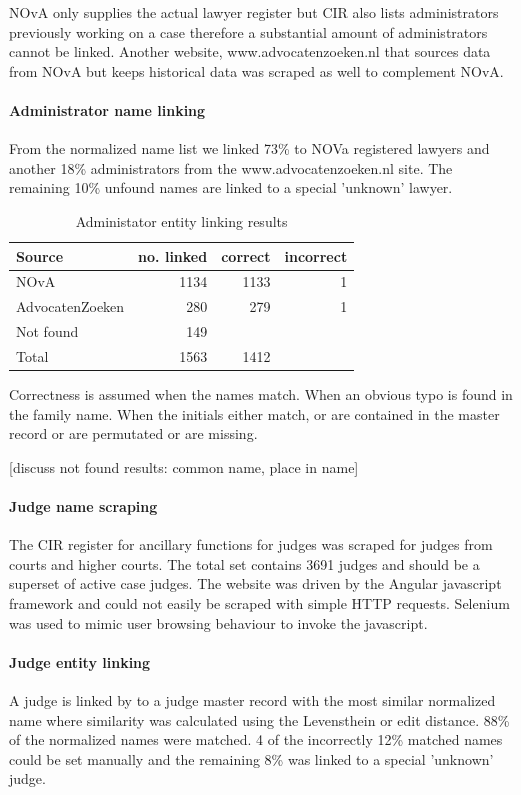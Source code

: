 NOvA only supplies the actual lawyer register but CIR also lists administrators previously working on a case therefore a substantial amount of administrators cannot be linked. Another website, www.advocatenzoeken.nl that sources data from NOvA but keeps historical data was scraped as well to complement NOvA.

\paragraph{Administrator name linking}
From the normalized name list we linked 73\% to NOVa registered lawyers and another 18\% administrators from the www.advocatenzoeken.nl site. The remaining 10\% unfound names are linked to a special 'unknown' lawyer.

\begin{table}[h]
\caption{Administator entity linking results}
\centering
\begin{tabular}{l r r r}
\hline\hline
Source & no. linked & correct & incorrect\\
\hline
NOvA & 1134 & 1133 & 1\\
AdvocatenZoeken & 280 & 279 & 1 \\
Not found & 149 &&\\
\hline
Total & 1563 & 1412 &\\
\hline
\end{tabular}
\label{table:administrator_linking}
\end{table}

Correctness is assumed when the names match. When an obvious typo is found in the family name. When the initials either match, or are contained in the master record or are permutated or are missing. 

[discuss not found results: common name, place in name]

\paragraph{Judge name scraping}
The CIR register for ancillary functions for judges was scraped for judges from courts and higher courts. The total set contains 3691 judges and should be a superset of active case judges. The website was driven by the Angular javascript framework and could not easily be scraped with simple HTTP requests. Selenium was used to mimic user browsing behaviour to invoke the javascript. 

\paragraph{Judge entity linking}
A judge is linked by to a judge master record with the most similar normalized name where similarity was calculated using the Levensthein or edit distance. 88\% of the normalized names were matched. 4 of the incorrectly 12\% matched names could be set manually and the remaining 8\% was linked to a special 'unknown' judge.


